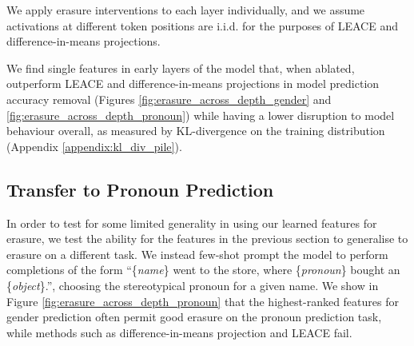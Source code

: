 We apply erasure interventions to each layer individually, and we assume activations at different token positions are i.i.d. for the purposes of LEACE and difference-in-means projections.


We find single features in early layers of the model that, when ablated, outperform LEACE and difference-in-means projections in model prediction accuracy removal (Figures \ref{fig:erasure_across_depth_gender} and \ref{fig:erasure_across_depth_pronoun}) while having a lower disruption to model behaviour overall, as measured by KL-divergence on the training distribution (Appendix \ref{appendix:kl_div_pile}). %

\subsection{Transfer to Pronoun Prediction}

In order to test for some limited generality in using our learned features for erasure, we test the ability for the features in the previous section to generalise to erasure on a different task. We instead few-shot prompt the model to perform completions of the form ``\{\emph{name}\} went to the store, where \{\emph{pronoun}\} bought an \{\emph{object}\}.'', choosing the stereotypical pronoun for a given name. We show in Figure \ref{fig:erasure_across_depth_pronoun} that the highest-ranked features for gender prediction often permit good erasure on the pronoun prediction task, while methods such as difference-in-means projection and LEACE fail.